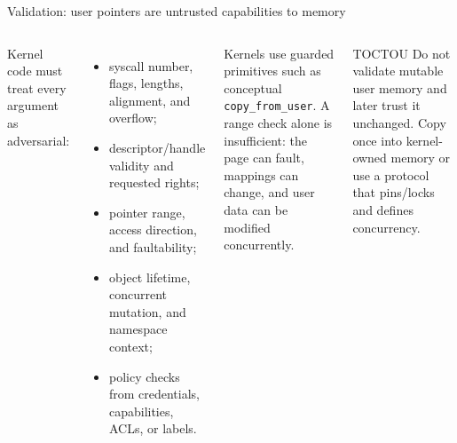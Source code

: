 \documentclass[aspectratio=169,11pt]{beamer}
\newcommand{\code}[1]{\texttt{#1}}
\begin{document}
\begin{frame}{Validation: user pointers are untrusted capabilities to memory}
  \begin{columns}[T,onlytextwidth]
      Kernel code must treat every argument as adversarial:
      \begin{itemize}
        \item syscall number, flags, lengths, alignment, and overflow;
        \item descriptor/handle validity and requested rights;
        \item pointer range, access direction, and faultability;
        \item object lifetime, concurrent mutation, and namespace context;
        \item policy checks from credentials, capabilities, ACLs, or labels.
      \end{itemize}
      \begin{tcolorbox}[title=Copying is a semantic boundary]
        Kernels use guarded primitives such as conceptual \code{copy\_from\_user}. A range check alone is insufficient: the page can fault, mappings can change, and user data can be modified concurrently.
      \end{tcolorbox}
      \begin{alertblock}{TOCTOU}
        Do not validate mutable user memory and later trust it unchanged. Copy once into kernel-owned memory or use a protocol that pins/locks and defines concurrency.
      \end{alertblock}
  \end{columns}
\end{frame}
\end{document}
